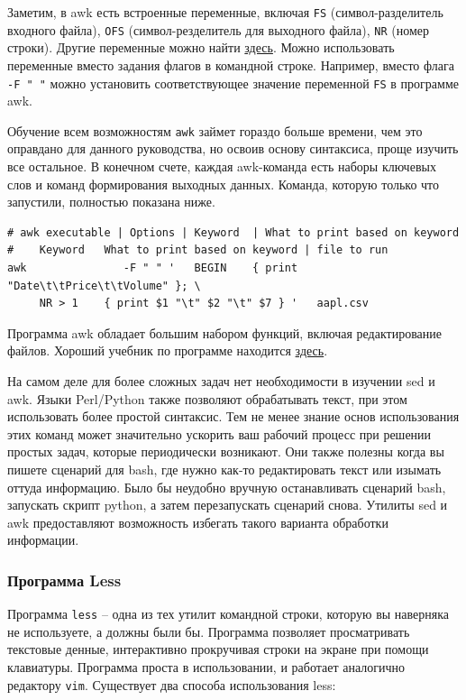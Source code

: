 \documentclass[12pt]{article}
\begin{document}
Заметим, в awk есть встроенные переменные, включая
\texttt{FS} (символ-разделитель входного файла), \texttt{OFS}
(символ-резделитель для выходного файла), \texttt{NR} (номер строки).
Другие переменные можно найти
\href{https://www.tutorialspoint.com/awk/awk_built_in_variables.htm}{здесь}.
Можно использовать переменные вместо задания флагов в командной строке.
Например, вместо флага \texttt{-F " "} можно установить
соответствующее значение переменной \texttt{FS} в программе awk.

Обучение всем возможностям \texttt{awk} займет гораздо больше времени,
чем это оправдано для данного руководства, но освоив основу синтаксиса,
проще изучить все остальное. В конечном счете, каждая awk-команда есть
наборы ключевых слов и команд формирования выходных данных. Команда,
которую только что запустили, полностью показана ниже.

\begin{verbatim}
# awk executable | Options | Keyword  | What to print based on keyword
#    Keyword   What to print based on keyword | file to run
awk               -F " " '   BEGIN    { print "Date\t\tPrice\t\tVolume" }; \
     NR > 1    { print $1 "\t" $2 "\t" $7 } '   aapl.csv
\end{verbatim}

Программа awk обладает большим набором функций, включая редактирование
файлов. Хороший учебник по программе находится
\href{https://likegeeks.com/awk-command/}{здесь}.

На самом деле для более сложных задач нет необходимости в изучении sed
и awk. Языки Perl/Python также позволяют обрабатывать текст, при этом
использовать более простой синтаксис. Тем не менее знание основ
использования этих команд может значительно ускорить ваш рабочий процесс
при решении простых задач, которые периодически возникают. Они также
полезны когда вы пишете сценарий для bash, где нужно как-то
редактировать текст или изымать оттуда информацию. Было бы неудобно
вручную останавливать сценарий bash, запускать скрипт python, а затем
перезапускать сценарий снова. Утилиты sed и awk предоставляют
возможность избегать такого варианта обработки информации.

\hypertarget{Less}{%
\subsubsection{\texorpdfstring{\protect\hyperlink{Less}{}Программа
Less}{Программа Less}}\label{Less}}

Программа \texttt{less} -- одна из тех утилит командной строки, которую вы
наверняка не используете, а должны были бы. Программа позволяет
просматривать текстовые денные, интерактивно прокручивая строки на
экране при помощи клавиатуры. Программа проста в использовании, и
работает аналогично редактору \texttt{vim}. Существует два способа использования
less:
\end{document}
